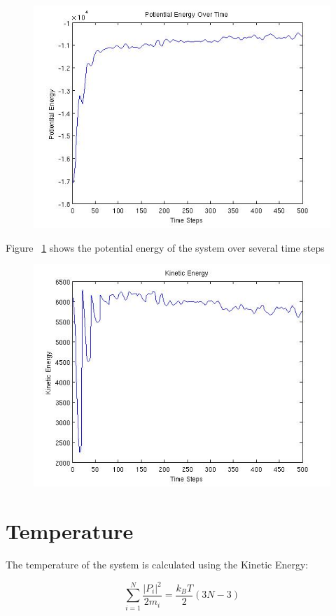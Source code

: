 \documentclass[10pt,a4paper]{article}
\begin{document}
\begin{figure}
	\centering
	\includegraphics[width=0.8\linewidth]{penergy2scale}
	\caption[Energy with temperature set to 2]{}
	\label{fig:penergy2scale}
\end{figure}

Figure ~\ref{fig:penergy2scale} shows the potential energy of the system over several time steps 

\begin{figure}
	\centering
	\includegraphics[width=0.8\linewidth]{kenergy2scale}
	\caption[Energy with temperature set to 2]{}
	\label{fig:kenergy2scale}
\end{figure}

\section{Temperature}
The temperature of the system is calculated using the Kinetic Energy:

$$ \sum_{i=1}^N \frac{|P_i|^2}{2 m_i} = \frac{k_B T}{2} (3N -3)$$
\end{document}
